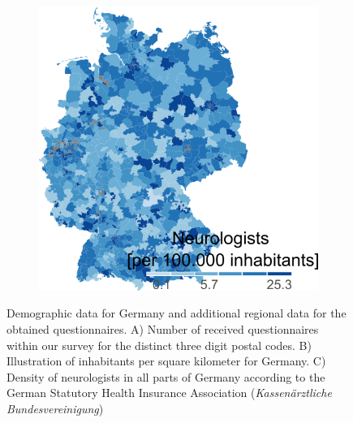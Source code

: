\documentclass{bmcart}
\begin{document}
\begin{backmatter}
\begin{figure}[!h]
\begin{subfigure}[b]{0.35\linewidth}
\label{fig1:population}
\end{subfigure}%
\begin{subfigure}[b]{0.35\linewidth}
\includegraphics[width=.90\textwidth]{fig1c.neurologist_density.v1.0.png}
\label{fig1:neurologists}
\end{subfigure}%
\caption{Demographic data for Germany and additional regional data for the obtained questionnaires. A) Number of received questionnaires within our survey for the distinct three digit postal codes. B) Illustration of inhabitants per square kilometer for Germany. C) Density of neurologists in all parts of Germany according to the German Statutory Health Insurance Association (\textit{Kassenärztliche Bundesvereinigung})}
\label{fig1:total}
\end{figure}


\end{backmatter}
\end{document}
